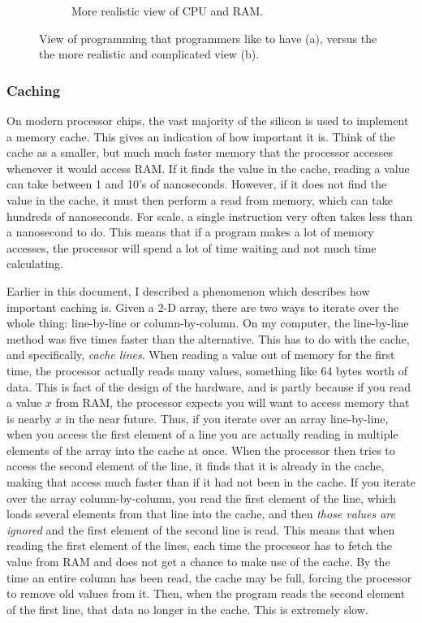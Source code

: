 \begin{figure}[h]
\begin{subfigure}{0.4\textwidth}
\caption{More realistic view of CPU and RAM.} \label{fig:1b}
\end{subfigure}
\label{fig:cpu-and-ram}
\caption{View of programming that programmers like to have (a), versus the the more realistic
	and complicated view (b).}
\end{figure}

\subsubsection{Caching}

On modern processor chips, the vast majority of the silicon is used to implement a memory cache. This gives an indication
of how important it is. Think of the cache as a smaller, but much much faster memory that the processor accesses whenever
it would access RAM. If it finds the value in the cache, reading a value can take between 1 and 10's of nanoseconds. However,
if it does not find the value in the cache, it must then perform a read from memory, which can take hundreds of nanoseconds.
For scale, a single instruction very often takes less than a nanosecond to do. This means that if a program makes a lot of
memory accesses, the processor will spend a lot of time waiting and not much time calculating.

Earlier in this document, I described a phenomenon which describes how important caching is. Given a 2-D array, there are two
ways to iterate over the whole thing: line-by-line or column-by-column. On my computer, the line-by-line method was five times
faster than the alternative. This has to do with the cache, and specifically, \textit{cache lines}. When reading a value out
of memory for the first time, the processor actually reads many values, something like 64 bytes worth of data. This is fact
of the design of the hardware, and is partly because if you read a value $x$ from RAM, the processor expects you will want to
access memory that is nearby $x$ in the near future. Thus, if you iterate over an array line-by-line, when you access the
first element of a line you are actually reading in multiple elements of the array into the cache at once. When the processor
then tries to access the second element of the line, it finds that it is already in the cache, making that access much faster
than if it had not been in the cache. If you iterate over the array column-by-column, you read the first element of the line,
which loads several elements from that line into the cache, and then \textit{those values are ignored} and the first element
of the second line is read. This means that when reading the first element of the lines, each time the processor has to fetch
the value from RAM and does not get a chance to make use of the cache. By the time an entire column has been read, the cache
may be full, forcing the processor to remove old values from it. Then, when the program reads the second element of the first line,
that data no longer in the cache. This is extremely slow.

